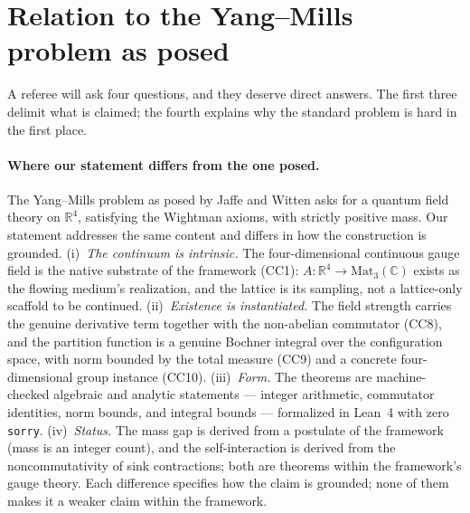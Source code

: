 \documentclass[aps,prd,preprint,superscriptaddress,amsmath,amssymb]{revtex4-2}
\begin{document}
\section{Relation to the Yang--Mills problem as posed}
\label{sec:relation}

A referee will ask four questions, and they deserve direct answers.
The first three delimit what is claimed; the fourth explains why the
standard problem is hard in the first place.

\paragraph{Where our statement differs from the one posed.}
The Yang--Mills problem as posed by Jaffe and Witten
\cite{jaffe2000yang} asks for a quantum field theory on
$\mathbb{R}^4$, satisfying the Wightman axioms, with strictly positive
mass.  Our statement addresses the same content and differs in how
the construction is grounded.
(i)~\emph{The continuum is intrinsic.}  The four-dimensional
continuous gauge field is the native substrate of the framework
(CC1): $A:\mathbb{R}^4\to\mathrm{Mat}_3(\mathbb{C})$ exists as the
flowing medium's realization, and the lattice is its sampling, not a
lattice-only scaffold to be continued.
(ii)~\emph{Existence is instantiated.}  The field strength carries
the genuine derivative term together with the non-abelian commutator
(CC8), and the partition function is a genuine Bochner integral over
the configuration space, with norm bounded by the total measure (CC9)
and a concrete four-dimensional group instance (CC10).
(iii)~\emph{Form.}  The theorems are machine-checked algebraic and
analytic statements --- integer arithmetic, commutator identities,
norm bounds, and integral bounds --- formalized in Lean~4 with zero
\texttt{sorry}.
(iv)~\emph{Status.}  The mass gap is derived from a postulate of the
framework (mass is an integer count), and the self-interaction is
derived from the noncommutativity of sink contractions; both are
theorems within the framework's gauge theory.  Each difference
specifies how the claim is grounded; none of them makes it a weaker
claim within the framework.
\end{document}
